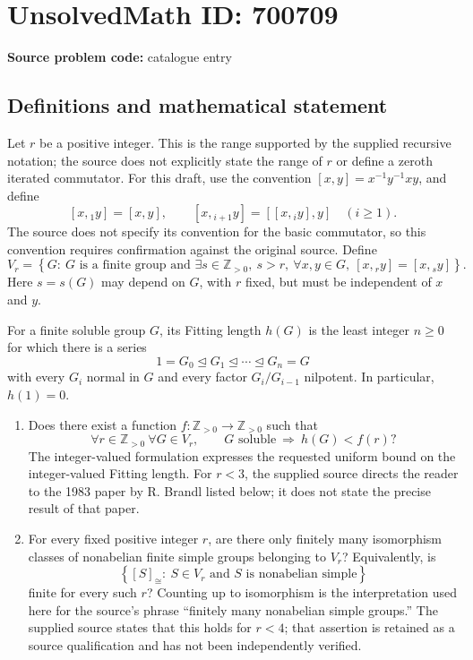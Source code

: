 \documentclass[11pt]{article}
\newcommand{\Z}{\mathbb{Z}}
\begin{document}
\section*{UnsolvedMath ID: 700709}
\textbf{Source problem code:} catalogue entry
\subsection{Definitions and mathematical statement}
Let \(r\) be a positive integer. This is the range supported by the supplied recursive notation; the source does not explicitly state the range of \(r\) or define a zeroth iterated commutator. For this draft, use the convention \([x,y]=x^{-1}y^{-1}xy\), and define
\[
[x,{}_1 y]=[x,y],\qquad [x,{}_{i+1}y]=[[x,{}_i y],y]\quad(i\geq 1).
\]
The source does not specify its convention for the basic commutator, so this convention requires confirmation against the original source. Define
\[
V_r=\left\{G:\ G\text{ is a finite group and }\exists s\in\Z_{>0},\ s>r,\ \forall x,y\in G,\ [x,{}_r y]=[x,{}_s y]\right\}.
\]
Here \(s=s(G)\) may depend on \(G\), with \(r\) fixed, but must be independent of \(x\) and \(y\).

For a finite soluble group \(G\), its Fitting length \(h(G)\) is the least integer \(n\geq 0\) for which there is a series
\[
1=G_0\trianglelefteq G_1\trianglelefteq\cdots\trianglelefteq G_n=G
\]
with every \(G_i\) normal in \(G\) and every factor \(G_i/G_{i-1}\) nilpotent. In particular, \(h(1)=0\).

\begin{enumerate}
\item[(a)] Does there exist a function \(f:\Z_{>0}\to\Z_{>0}\) such that
\[
\forall r\in\Z_{>0}\ \forall G\in V_r,\qquad G\text{ soluble}\ \Longrightarrow\ h(G)<f(r)?
\]
The integer-valued formulation expresses the requested uniform bound on the integer-valued Fitting length. For \(r<3\), the supplied source directs the reader to the 1983 paper by R. Brandl listed below; it does not state the precise result of that paper.
\item[(b)] For every fixed positive integer \(r\), are there only finitely many isomorphism classes of nonabelian finite simple groups belonging to \(V_r\)? Equivalently, is
\[
\left\{[S]_{\cong}:\ S\in V_r\text{ and }S\text{ is nonabelian simple}\right\}
\]
finite for every such \(r\)? Counting up to isomorphism is the interpretation used here for the source's phrase ``finitely many nonabelian simple groups.'' The supplied source states that this holds for \(r<4\); that assertion is retained as a source qualification and has not been independently verified.
\end{enumerate}
\end{document}
